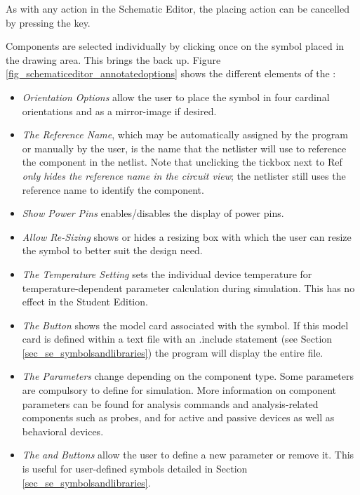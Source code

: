 As with any action in the Schematic Editor, the placing action can be cancelled by pressing the  key.

Components are selected individually by clicking once on the symbol placed in the drawing area.  This brings the  back up.  Figure \ref{fig_schematiceditor_annotatedoptions} shows the different elements of the :

\begin{itemize}
\item \textit{Orientation Options} allow the user to place the symbol in four cardinal orientations and as a mirror-image if desired.
\item \textit{The Reference Name}, which may be automatically assigned by the program or manually by the user, is the name that the netlister will use to reference the component in the netlist.  Note that unclicking the tickbox next to \textsf{Ref} \textit{only hides the reference name in the circuit view}; the netlister still uses the reference name to identify the component.
\item \textit{Show Power Pins} enables/disables the display of power pins.
\item \textit{Allow Re-Sizing} shows or hides a resizing box with which the user can resize the symbol to better suit the design need.
\item \textit{The Temperature Setting} sets the individual device temperature for temperature-dependent parameter calculation during simulation.  This has no effect in the Student Edition.
\item \textit{The}  \textit{Button} shows the model card associated with the symbol.  If this model card is defined within a text file with an \textsf{.include} statement (see Section \ref{sec_se_symbolsandlibraries}) the program will display the entire file.
\item \textit{The Parameters} change depending on the component type.  Some parameters are compulsory to define for simulation.  More information on component parameters can be found for analysis commands and analysis-related components such as probes, and for active and passive devices as well as behavioral devices.
\item \textit{The}  \textit{and}  \textit{Buttons} allow the user to define a new parameter or remove it. This is useful for user-defined symbols detailed in Section \ref{sec_se_symbolsandlibraries}.
\end{itemize}

